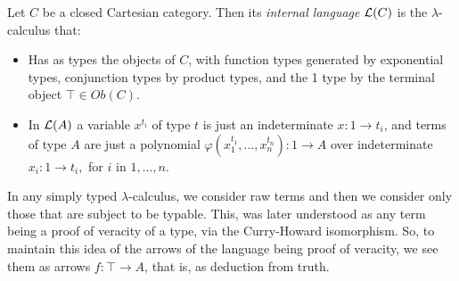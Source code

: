 \begin{definition}
\begin{definition}
  Let $C$ be a closed Cartesian category. Then its \emph{internal language} $\mathcal{L} (C)$ is the $\lambda$-calculus that:
  \begin{itemize}
  \item Has as types the objects of $C$, with function types generated by exponential types, conjunction types by product types, and the 1 type by the terminal object $\top \in Ob(C)$.%
  \item In $\mathcal{L}(A)$ a variable $x^{t_i}$ of type $t$ is just an indeterminate  $x:1 \to t_i$, and terms of type $A$ are just a polynomial $\varphi(x_1^{t_1},...,x_n^{t_n}):1 \to A$ over indeterminate $x_i: 1 \to t_i,$ for $i$ in $1,...,n$.
  \end{itemize}

\end{definition}

\begin{remark}
  In any simply typed $\lambda$-calculus, we consider raw terms and then we consider only those that are subject to be typable. This, was later understood as any term being a proof of veracity of a type, via the Curry-Howard isomorphism. So, to maintain this idea of the arrows of the language being proof of veracity, we see them as arrows $f:\top \to A$, that is, as deduction from truth. \\
\end{remark}


\end{definition}
